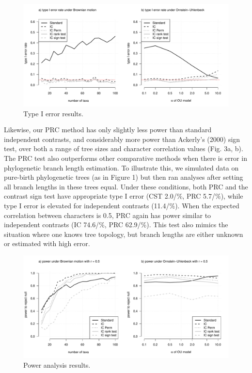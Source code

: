 \documentclass[fleqn,10pt,lineno]{wlpeerj} %
\begin{document}
\begin{figure}
\includegraphics[width=1\linewidth]{Harmon-and-Revell_NonParametricPCM.PeerJ_files/figure-latex/Harmon-fig2-1} \caption{Type I error results.}\label{fig:Harmon-fig2}
\end{figure}

Likewise, our PRC method has only slightly less power than standard independent contrasts, and considerably more power than Ackerly's (2000) sign test, over both a range of tree sizes and character correlation values (Fig. 3a, b). The PRC test also outperforms other comparative methods when there is error in phylogenetic branch length estimation. To illustrate this, we simulated data on pure-birth phylogenetic trees (as in Figure 1) but then ran analyses after setting all branch lengths in these trees equal. Under these conditions, both PRC and the contrast sign test have appropriate type I error (CST 2.0/\%, PRC 5.7/\%), while type I error is elevated for independent contrasts (11.4/\%). When the expected correlation between characters is 0.5, PRC again has power similar to independent contrasts (IC 74.6/\%, PRC 62.9/\%). This test also mimics the situation where one knows tree topology, but branch lengths are either unknown or estimated with high error.

\begin{figure}
\includegraphics[width=1\linewidth]{Harmon-and-Revell_NonParametricPCM.PeerJ_files/figure-latex/Harmon-fig3-1} \caption{Power analysis results.}\label{fig:Harmon-fig3}
\end{figure}
\end{document}
